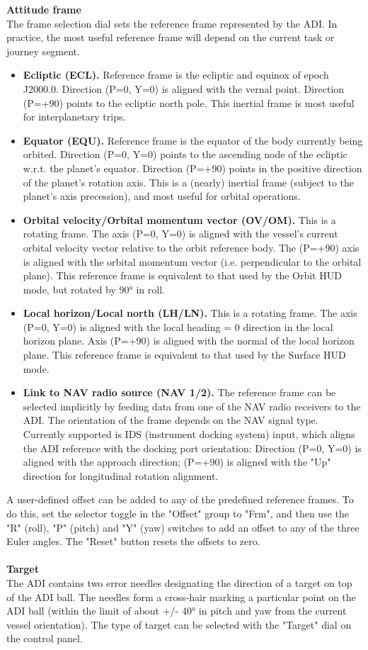 \documentclass[Orbiter User Manual.tex]{subfiles}
\begin{document}
\noindent
\textbf{Attitude frame}\\
The frame selection dial sets the reference frame represented by the ADI. In practice, the most useful reference frame will depend on the current task or journey segment.

\begin{itemize} 
\item \textbf{Ecliptic (ECL).} Reference frame is the ecliptic and equinox of epoch J2000.0. Direction (P=0, Y=0) is aligned with the vernal point. Direction (P=+90) points to the ecliptic north pole. This inertial frame is most useful for interplanetary trips.
\item \textbf{Equator (EQU).} Reference frame is the equator of the body currently being orbited. Direction (P=0, Y=0) points to the ascending node of the ecliptic w.r.t. the planet's equator. Direction (P=+90) points in the positive direction of the planet's rotation axis. This is a (nearly) inertial frame (subject to the planet's axis precession), and most useful for orbital operations.
\item \textbf{Orbital velocity/Orbital momentum vector (OV/OM).} This is a rotating frame. The axis (P=0, Y=0) is aligned with the vessel's current orbital velocity vector relative to the orbit reference body. The (P=+90) axis is aligned with the orbital momentum vector (i.e. perpendicular to the orbital plane). This reference frame is equivalent to that used by the Orbit HUD mode, but rotated by 90° in roll.
\item \textbf{Local horizon/Local north (LH/LN).} This is a rotating frame. The axis (P=0, Y=0) is aligned with the local heading = 0 direction in the local horizon plane. Axis (P=+90) is aligned with the normal of the local horizon plane. This reference frame is equivalent to that used by the Surface HUD mode.
\item \textbf{Link to NAV radio source (NAV 1/2).} The reference frame can be selected implicitly by feeding data from one of the NAV radio receivers to the ADI. The orientation of the frame depends on the NAV signal type. Currently supported is IDS (instrument docking system) input, which aligns the ADI reference with the docking port orientation: Direction (P=0, Y=0) is aligned with the approach direction; (P=+90) is aligned with the "Up" direction for longitudinal rotation alignment.
\end{itemize}

\noindent
A user-defined offset can be added to any of the predefined reference frames. To do this, set the selector toggle in the "Offset" group to "Frm", and then use the "R" (roll), "P" (pitch) and "Y" (yaw) switches to add an offset to any of the three Euler angles. The "Reset" button resets the offsets to zero.\\
\\
\textbf{Target}\\
The ADI contains two error needles designating the direction of a target on top of the ADI ball. The needles form a cross-hair marking a particular point on the ADI ball (within the limit of about +/- 40° in pitch and yaw from the current vessel orientation). The type of target can be selected with the "Target" dial on the control panel.
\end{document}
